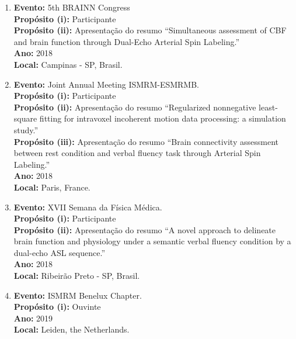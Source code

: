 \documentclass[a4paper,oneside,10pt]{article}
\begin{document}
\begin{enumerate}
        \item   \textbf{Evento:} 5th BRAINN Congress \mbox{} \\
        \textbf{Propósito (i):} Participante\\
        \textbf{Propósito (ii):} Apresentação do resumo ``Simultaneous assessment of CBF and brain function through Dual-Echo Arterial Spin Labeling.''\\
        \textbf{Ano:} 2018\\
        \textbf{Local:} Campinas - SP, Brasil.

        \item   \textbf{Evento:} Joint Annual Meeting ISMRM-ESMRMB. \mbox{} \\
        \textbf{Propósito (i):} Participante \\
        \textbf{Propósito (ii):} Apresentação do resumo ``Regularized nonnegative least-square fitting for intravoxel incoherent motion data processing: a simulation study.''\\
        \textbf{Propósito (iii):} Apresentação do resumo ``Brain connectivity assessment between rest condition and verbal fluency task through Arterial Spin Labeling.'' \\
        \textbf{Ano:} 2018\\
        \textbf{Local:} Paris, France.

        \item   \textbf{Evento:} XVII Semana da Física Médica. \mbox{} \\
        \textbf{Propósito (i):} Participante\\
        \textbf{Propósito (ii):} Apresentação do resumo ``A novel approach to delineate brain function and physiology under a semantic verbal fluency condition by a dual-echo ASL sequence.''\\
        \textbf{Ano:} 2018\\
        \textbf{Local:} Ribeirão Preto - SP, Brasil.

        \item   \textbf{Evento:} ISMRM Benelux Chapter. \mbox{} \\
        \textbf{Propósito (i):} Ouvinte\\
        \textbf{Ano:} 2019\\
        \textbf{Local:} Leiden, the Netherlands.


\end{enumerate}
\end{document}
